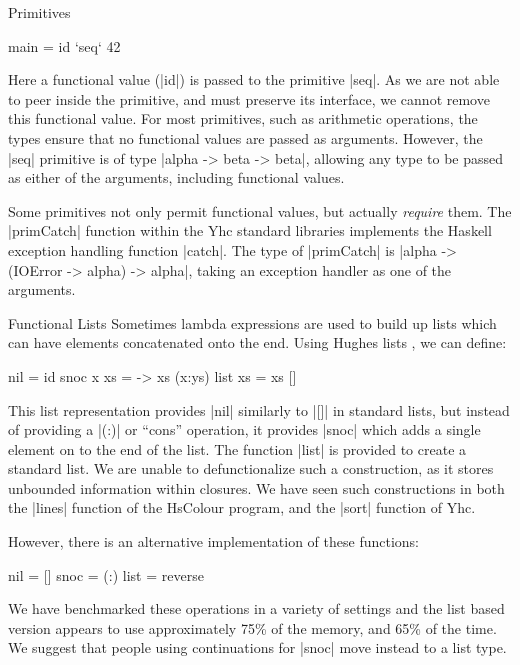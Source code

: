 \documentclass[preprint]{sigplanconf}
\begin{document}
\begin{examplename}{Primitives}
\begin{code}
main = id `seq` 42
\end{code}

Here a functional value (|id|) is passed to the primitive |seq|. As we are not able to peer inside the primitive, and must preserve its interface, we cannot remove this functional value. For most primitives, such as arithmetic operations, the types ensure that no functional values are passed as arguments. However, the |seq| primitive is of type |alpha -> beta -> beta|, allowing any type to be passed as either of the arguments, including functional values.

Some primitives not only permit functional values, but actually \textit{require} them. The |primCatch| function within the Yhc standard libraries implements the Haskell exception handling function |catch|. The type of |primCatch| is |alpha -> (IOError -> alpha) -> alpha|, taking an exception handler as one of the arguments.
\end{examplename}

\begin{examplename}{Functional Lists}
\label{ex:functional_lists}
Sometimes lambda expressions are used to build up lists which can have elements concatenated onto the end. Using Hughes lists \cite{hughes:lists}, we can define:

\begin{code}
nil = id
snoc x xs = \ys -> xs (x:ys)
list xs = xs []
\end{code}

This list representation provides |nil| similarly to |[]| in standard lists, but instead of providing a |(:)| or ``cons'' operation, it provides |snoc| which adds a single element on to the end of the list. The function |list| is provided to create a standard list. We are unable to defunctionalize such a construction, as it stores unbounded information within closures. We have seen such constructions in both the |lines| function of the HsColour program, and the |sort| function of Yhc.

However, there is an alternative implementation of these functions:

\begin{code}
nil = []
snoc = (:)
list = reverse
\end{code}

We have benchmarked these operations in a variety of settings and the list based version appears to use approximately 75\% of the memory, and 65\% of the time. We suggest that people using continuations for |snoc| move instead to a list type.
\end{examplename}
\end{document}

